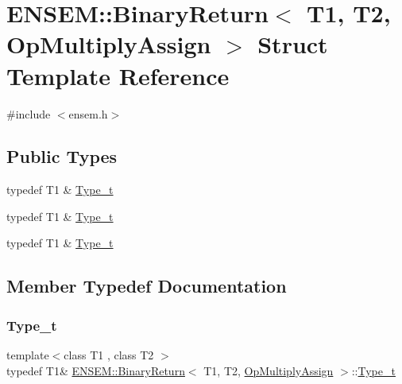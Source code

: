 \hypertarget{structENSEM_1_1BinaryReturn_3_01T1_00_01T2_00_01OpMultiplyAssign_01_4}{}\section{E\+N\+S\+EM\+:\+:Binary\+Return$<$ T1, T2, Op\+Multiply\+Assign $>$ Struct Template Reference}
\label{structENSEM_1_1BinaryReturn_3_01T1_00_01T2_00_01OpMultiplyAssign_01_4}


{\ttfamily \#include $<$ensem.\+h$>$}

\subsection*{Public Types}
\begin{DoxyCompactItemize}
\item 
typedef T1 \& \mbox{\hyperlink{structENSEM_1_1BinaryReturn_3_01T1_00_01T2_00_01OpMultiplyAssign_01_4_adc30f204bdf8c74d41a342332a239687}{Type\+\_\+t}}
\item 
typedef T1 \& \mbox{\hyperlink{structENSEM_1_1BinaryReturn_3_01T1_00_01T2_00_01OpMultiplyAssign_01_4_adc30f204bdf8c74d41a342332a239687}{Type\+\_\+t}}
\item 
typedef T1 \& \mbox{\hyperlink{structENSEM_1_1BinaryReturn_3_01T1_00_01T2_00_01OpMultiplyAssign_01_4_adc30f204bdf8c74d41a342332a239687}{Type\+\_\+t}}
\end{DoxyCompactItemize}


\subsection{Member Typedef Documentation}
\mbox{\label{structENSEM_1_1BinaryReturn_3_01T1_00_01T2_00_01OpMultiplyAssign_01_4_adc30f204bdf8c74d41a342332a239687}} 
\subsubsection{\texorpdfstring{Type\_t}{Type\_t}\hspace{0.1cm}{\footnotesize\ttfamily [1/3]}}
{\footnotesize\ttfamily template$<$class T1 , class T2 $>$ \\
typedef T1\& \mbox{\hyperlink{structENSEM_1_1BinaryReturn}{E\+N\+S\+E\+M\+::\+Binary\+Return}}$<$ T1, T2, \mbox{\hyperlink{structENSEM_1_1OpMultiplyAssign}{Op\+Multiply\+Assign}} $>$\+::\mbox{\hyperlink{structENSEM_1_1BinaryReturn_3_01T1_00_01T2_00_01OpMultiplyAssign_01_4_adc30f204bdf8c74d41a342332a239687}{Type\+\_\+t}}}

